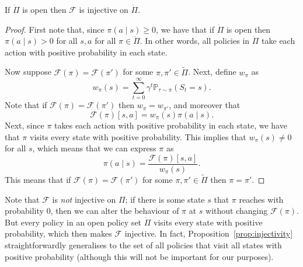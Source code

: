 \begin{proposition}\label{prop:injectivity}
If $\dot{\Pi}$ is open then $\mathcal{F}$ is injective on $\dot{\Pi}$.
\end{proposition}
\begin{proof}
First note that, since $\pi(a \mid s) \geq 0$, we have that if $\dot{\Pi}$ is open then $\pi(a \mid s) > 0$ for all $s,a$ for all $\pi \in \dot{\Pi}$. In other words, all policies in $\dot{\Pi}$ take each action with positive probability in each state. 

Now suppose $\mathcal{F}(\pi) = \mathcal{F}(\pi')$ for some $\pi,\pi' \in \tilde{\Pi}$. Next, define $w_\pi$ as
$$
w_\pi(s) = \sum_{t=0}^\infty \gamma^t \mathbb{P}_{\tau \sim \pi}(S_t = s).
$$
Note that if $\mathcal{F}(\pi) = \mathcal{F}(\pi')$ then $w_\pi = w_{\pi'}$, and moreover that
$$
\mathcal{F}(\pi)[s,a] = w_\pi(s)\pi(a \mid s).
$$
Next, since $\pi$ takes each action with positive probability in each state, we have that $\pi$ visits every state with positive probability. This implies that $w_{\pi}(s) \neq 0$ for all $s$, which means that we can express $\pi$ as
$$
\pi(a \mid s) = \frac{\mathcal{F}(\pi)[s,a]}{w_\pi(s)}.
$$
This means that if $\mathcal{F}(\pi) = \mathcal{F}(\pi')$ for some $\pi,\pi' \in \tilde{\Pi}$ then $\pi = \pi'$.
\end{proof}

Note that $\mathcal{F}$ is \emph{not} injective on $\Pi$; if there is some state $s$ that $\pi$ reaches with probability $0$, then we can alter the behaviour of $\pi$ at $s$ without changing $\mathcal{F}(\pi)$. But every policy in an open policy set $\dot{\Pi}$ visits every state with positive probability, which then makes $\mathcal{F}$ injective. In fact, Proposition~\ref{prop:injectivity} straightforwardly generalises to the set of all policies that visit all states with positive probability (although this will not be important for our purposes).%


